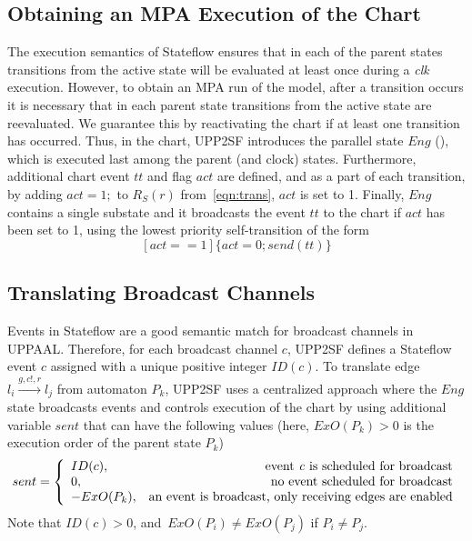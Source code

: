 \subsection{Obtaining an MPA Execution of the Chart}
\label{sec:sfmpa}
The execution semantics of Stateflow ensures that in each of the parent states transitions from the active state will be evaluated at least once during a \textit{clk} execution. However, to obtain an MPA run of the model, after a transition occurs it is necessary that in each parent state transitions from the active state are reevaluated. We guarantee this by reactivating the chart if at least one transition has occurred. Thus, in the chart, UPP2SF introduces the parallel state $Eng$ (), which is executed last among the parent (and clock) states. Furthermore, additional chart event $tt$ and flag $act$ are defined, and as a part of each transition, by adding $act=1;$ to $R_S(r)$ from~\eqref{eqn:trans}, $act$ is set to 1. 
Finally, $Eng$ contains a single substate and it broadcasts the event $tt$ to the chart if $act$ has been set to 1, using the lowest priority self-transition of the form
\begin{equation}
\label{shrst}
[act==1]\{act=0; send(tt)\}
\end{equation}



\subsection{Translating Broadcast Channels}
Events in Stateflow are a good semantic match for broadcast channels in UPPAAL. Therefore, for each broadcast channel $c$, UPP2SF defines a Stateflow event $c$ assigned with a unique positive integer $ID(c)$. To translate edge $l_i \xrightarrow{g,c!,r} l_j$ from automaton $P_k$, UPP2SF uses a centralized approach where the $Eng$ state broadcasts events and controls execution of the chart by using additional variable $sent$ that can have the following values (here, $ExO(P_k)>0$ is the execution order of the parent state $P_k$)
\begin{equation}
sent = \left\{
\begin{array}{lr} 
ID(c), & \hbox{event \textit{c} is scheduled for broadcast}\\
0, & \hbox{no event scheduled for broadcast}\\
-ExO(P_k), & \hbox{an event is broadcast, only receiving edges are enabled}
\end{array}
\right.
\end{equation}
Note that $ID(c)>0$, and~$ExO(P_i)\neq ExO(P_j)$ if $P_i\neq P_j$. 



